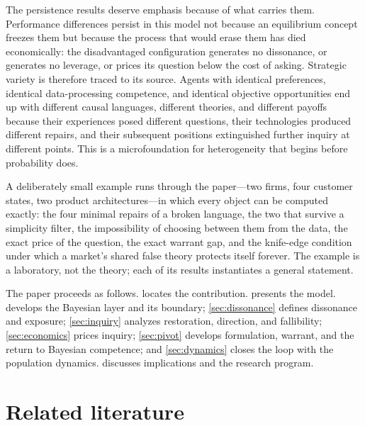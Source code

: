 \documentclass[11pt]{article}
\theoremstyle{definition}
\begin{document}
The persistence results deserve emphasis because of what carries them.
Performance differences persist in this model not because an equilibrium
concept freezes them but because the process that would erase them has died
economically: the disadvantaged configuration generates no dissonance, or
generates no leverage, or prices its question below the cost of asking.
Strategic variety is therefore traced to its source.  Agents with identical
preferences, identical data-processing competence, and identical objective
opportunities end up with different causal languages, different theories, and
different payoffs because their experiences posed different questions, their
technologies produced different repairs, and their subsequent positions
extinguished further inquiry at different points.  This is a microfoundation
for heterogeneity that begins before probability does.

A deliberately small example runs through the paper---two firms, four
customer states, two product architectures---in which every object can be
computed exactly: the four minimal repairs of a broken language, the two that
survive a simplicity filter, the impossibility of choosing between them from
the data, the exact price of the question, the exact warrant gap, and the
knife-edge condition under which a market's shared false theory protects
itself forever.  The example is a laboratory, not the theory; each of its
results instantiates a general statement.

The paper proceeds as follows.   locates the
contribution.   presents the model.
 develops the Bayesian layer and its boundary;
\cref{sec:dissonance} defines dissonance and exposure;
\cref{sec:inquiry} analyzes restoration, direction, and fallibility;
\cref{sec:economics} prices inquiry; \cref{sec:pivot} develops formulation,
warrant, and the return to Bayesian competence; and \cref{sec:dynamics}
closes the loop with the population dynamics.  
discusses implications and the research program.
\section{Related literature}
\label{sec:literature}
\end{document}
